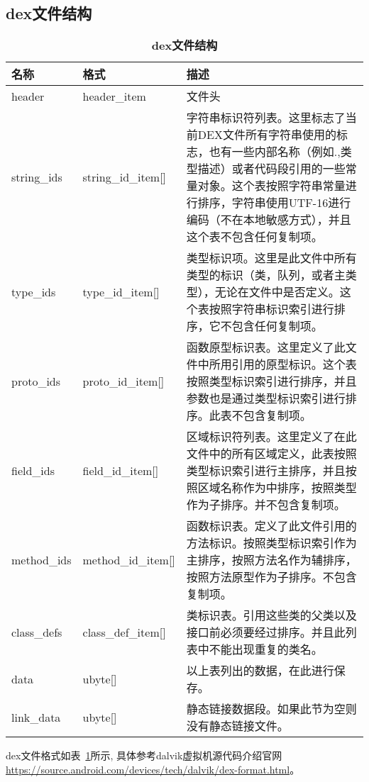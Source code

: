 \subsection{dex文件结构}
\begin{table}[htbp]
\caption{\label{tab:dex}\textbf{dex文件结构}}
\begin{tabular}{|p{1.6cm}|p{2.7cm}|p{8.5cm}|}
\hline
名称 & 格式 & 描述\\
\hline
header & header\_item & 文件头\\
\hline
string\_ids & string\_id\_item[] & 字符串标识符列表。这里标志了当前DEX文件所有字符串使用的标志，也有一些内部名称（例如.,类型描述）或者代码段引用的一些常量对象。这个表按照字符串常量进行排序，字符串使用UTF-16进行编码（不在本地敏感方式），并且这个表不包含任何复制项。\\
\hline
type\_ids & type\_id\_item[] & 类型标识项。这里是此文件中所有类型的标识（类，队列，或者主类型），无论在文件中是否定义。这个表按照字符串标识索引进行排序，它不包含任何复制项。\\
\hline
proto\_ids & proto\_id\_item[] & 函数原型标识表。这里定义了此文件中所用引用的原型标识。这个表按照类型标识索引进行排序，并且参数也是通过类型标识索引进行排序。此表不包含复制项。\\
\hline
field\_ids & field\_id\_item[] & 区域标识符列表。这里定义了在此文件中的所有区域定义，此表按照类型标识索引进行主排序，并且按照区域名称作为中排序，按照类型作为子排序。并不包含复制项。\\
\hline
method\_ids & method\_id\_item[] & 函数标识表。定义了此文件引用的方法标识。按照类型标识索引作为主排序，按照方法名作为辅排序，按照方法原型作为子排序。不包含复制项。\\
\hline
class\_defs & class\_def\_item[] & 类标识表。引用这些类的父类以及接口前必须要经过排序。并且此列表中不能出现重复的类名。\\
\hline
data & ubyte[] & 以上表列出的数据，在此进行保存。\\
\hline
link\_data & ubyte[] & 静态链接数据段。如果此节为空则没有静态链接文件。\\
\hline
\end{tabular}
\end{table}

dex文件格式如表~\ref{tab:dex}所示,
具体参考dalvik虚拟机源代码介绍官网
\url{https://source.android.com/devices/tech/dalvik/dex-format.html}。
